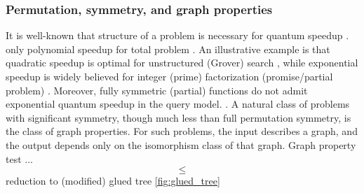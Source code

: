 \subsubsection{Permutation, symmetry, and graph properties}
It is well-known that structure of a problem is necessary for quantum speedup \cite{aaronsonNeedStructureQuantum2014}.
only polynomial speedup for total problem \cite{bealsQuantumLowerBounds2001} \cite{aaronsonQuantumImplicationsHuang2020}.
An illustrative example is that quadratic speedup is optimal for unstructured (Grover) search \cite{groverQuantumMechanicsHelps1997}, while exponential speedup is widely believed for integer (prime) factorization (promise/partial problem) \cite{shorPolynomialTimeAlgorithmsPrime1997}.
Moreover, fully symmetric (partial) functions do not admit exponential quantum speedup in the query model.
\cite{ben-davidSymmetriesGraphProperties2020}.
A natural class of problems with significant symmetry, though much less than full permutation symmetry, is the class of graph properties. For such problems, the input describes a graph, and the output depends only on the isomorphism class of that graph. 
Graph property test ...
\begin{equation}
	\le 
\end{equation}
reduction to (modified) glued tree \cref{fig:glued_tree}


